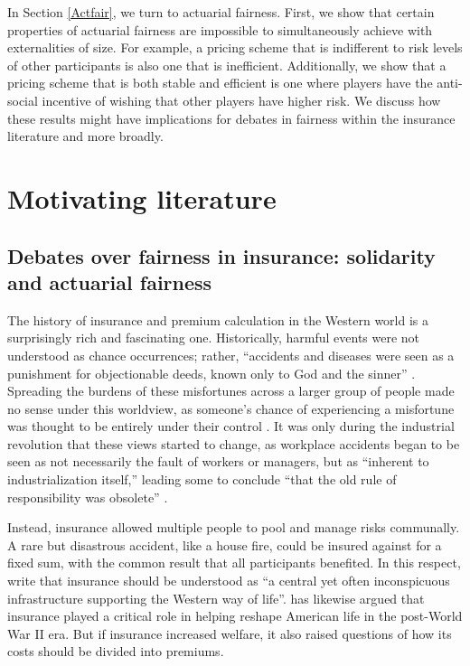 \documentclass[sigconf]{acmart}
\begin{document}
In Section \ref{Actfair}, we turn to actuarial fairness. First, we show that certain properties of actuarial fairness are impossible to simultaneously achieve with externalities of size. For example, a pricing scheme that is indifferent to risk levels of other participants is also one that is inefficient. Additionally, we show that a pricing scheme that is both stable and efficient is one where players have the anti-social incentive of wishing that other players have higher risk. We discuss how these results might have implications for debates in fairness within the insurance literature and more broadly. 

\section{Motivating literature}\label{literature}
\subsection{Debates over fairness in insurance: solidarity and actuarial fairness}\label{insurance}

The history of insurance and premium calculation in the Western world is a surprisingly rich and fascinating one. Historically, harmful events were not understood as chance occurrences; rather, \enquote{accidents and diseases were seen as a punishment for objectionable deeds, known only to God and the sinner} \cite{barry2019insurance}. Spreading the burdens of these misfortunes across a larger group of people made no sense under this worldview, as someone's chance of experiencing a misfortune was thought to be entirely under their control \cite{bernstein1996against}. It was only during the industrial revolution that these views started to change, as workplace accidents began to be seen as not necessarily the fault of workers or managers, but as \enquote{inherent to industrialization itself,} leading some to conclude \enquote{that the old rule of responsibility was obsolete}  \cite{barry2019insurance}. 

Instead, insurance allowed multiple people to pool and manage risks communally. A rare but disastrous accident, like a house fire, could be insured against for a fixed sum, with the common result that all participants benefited. In this respect, \citet{lehtonen2011forms} write that insurance should be understood as \enquote{a central yet often inconspicuous infrastructure supporting the Western way of life}. \citet{horan2011actuarial} has likewise argued that insurance played a critical role in helping reshape American life in the post-World War II era. But if insurance increased welfare, it also raised questions of how its costs should be divided into premiums.
\end{document}
